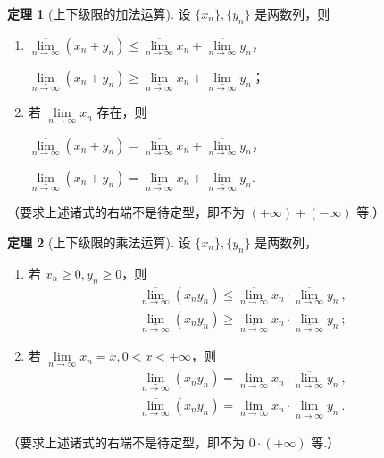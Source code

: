 \documentclass[zihao=-4,linespread=1.8,UTF8,nothm]{aytony_base}
\theoremstyle{definition}
\newtheorem{theorem}{\indent\heiti\textbf{定理}}[subsection]
\begin{document}
\begin{theorem}[上下级限的加法运算]
    设 $\{x_n\},\{y_n\}$ 是两数列，则
    \begin{enumerate}
        \item $\underset{n \to \infty}{\overline{\lim}} (x_n + y_n) \leqslant \underset{n \to \infty}{\overline{\lim}} x_n + \underset{n \to \infty}{\overline{\lim}} y_n$，

              $\underset{n \to \infty}{\underline{\lim}} (x_n + y_n) \geqslant \underset{n \to \infty}{\underline{\lim}} x_n + \underset{n \to \infty}{\underline{\lim}} y_n$；
        \item 若 $\lim\limits_{n \to \infty} x_n$ 存在，则

              $\underset{n \to \infty}{\overline{\lim}} (x_n + y_n) = \underset{n \to \infty}{\overline{\lim}} x_n + \underset{n \to \infty}{\overline{\lim}} y_n$，

              $\underset{n \to \infty}{\underline{\lim}} (x_n + y_n) = \underset{n \to \infty}{\underline{\lim}} x_n + \underset{n \to \infty}{\underline{\lim}} y_n$.
    \end{enumerate}
    （要求上述诸式的右端不是待定型，即不为 $(+\infty) + (-\infty)$ 等.）
\end{theorem}

\begin{theorem}[上下级限的乘法运算]
    设 $\{x_n\}, \{y_n\}$ 是两数列，
    \begin{enumerate}
        \item 若 $x_n \geqslant 0, y_n \geqslant 0$，则 $$
                  \begin{aligned}
                      \underset{n \to \infty}{\overline{\lim}} (x_ny_n) \leqslant \underset{n \to \infty}{\overline{\lim}} x_n \cdot \underset{n \to \infty}{\overline{\lim}} y_n\ , \\
                      \underset{n \to \infty}{\underline{\lim}} (x_ny_n) \geqslant \underset{n \to \infty}{\underline{\lim}} x_n \cdot \underset{n \to \infty}{\underline{\lim}} y_n\ ;
                  \end{aligned}
              $$
        \item 若 $\lim\limits_{n \to \infty} x_n = x, 0 < x < +\infty$，则 $$
                  \begin{aligned}
                      \underset{n \to \infty}{\underline{\lim}} (x_ny_n) = \lim\limits_{n \to \infty} x_n \cdot \underset{n \to \infty}{\overline{\lim}} y_n\ , \\
                      \underset{n \to \infty}{\overline{\lim}} (x_ny_n) = \lim\limits_{n \to \infty} x_n \cdot \underset{n \to \infty}{\underline{\lim}} y_n\ .
                  \end{aligned}
              $$
    \end{enumerate}
    （要求上述诸式的右端不是待定型，即不为 $0 \cdot (+\infty)$ 等.）
\end{theorem}
\end{document}
